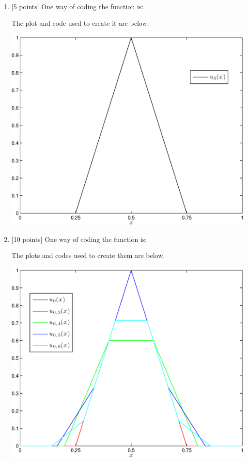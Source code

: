 \begin{solution}

\begin{enumerate}
\item {[5 points]}  One way of coding the function is:



The plot and code used to create it are below.

\begin{center}
\includegraphics[scale=0.7]{hw49a.eps}
\end{center}



\vspace*{1em}
\item {[10 points]} One way of coding the function is:



The plots and codes used to create them are below.

\begin{center}
\includegraphics[scale=0.7]{hw49b1.eps}
\end{center}


\end{enumerate}
\end{solution}
